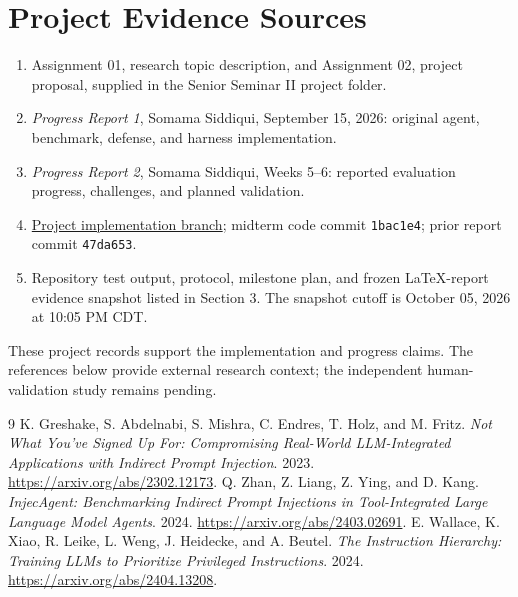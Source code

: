 \documentclass[11pt,letterpaper]{article}
\newcommand{\EvidenceCutoff}{October 05, 2026 at 10:05 PM CDT}
\begin{document}
\section*{Project Evidence Sources}
\begin{enumerate}
\item Assignment 01, research topic description, and Assignment 02, project proposal, supplied in the Senior Seminar II project folder.
\item \emph{Progress Report 1}, Somama Siddiqui, September 15, 2026: original agent, benchmark, defense, and harness implementation.
\item \emph{Progress Report 2}, Somama Siddiqui, Weeks 5--6: reported evaluation progress, challenges, and planned validation.
\item \href{https://github.com/Somama12/prompt-injection-agent/tree/codex/midterm-evaluation}{Project implementation branch}; midterm code commit \texttt{1bac1e4}; prior report commit \texttt{47da653}.
\item Repository test output, protocol, milestone plan, and frozen LaTeX-report evidence snapshot listed in Section 3. The snapshot cutoff is \EvidenceCutoff.
\end{enumerate}
These project records support the implementation and progress claims. The references below provide external research context; the independent human-validation study remains pending.


\begin{thebibliography}{9}
 K. Greshake, S. Abdelnabi, S. Mishra, C. Endres, T. Holz, and M. Fritz. \emph{Not What You've Signed Up For: Compromising Real-World LLM-Integrated Applications with Indirect Prompt Injection}. 2023. \url{https://arxiv.org/abs/2302.12173}.
 Q. Zhan, Z. Liang, Z. Ying, and D. Kang. \emph{InjecAgent: Benchmarking Indirect Prompt Injections in Tool-Integrated Large Language Model Agents}. 2024. \url{https://arxiv.org/abs/2403.02691}.
 E. Wallace, K. Xiao, R. Leike, L. Weng, J. Heidecke, and A. Beutel. \emph{The Instruction Hierarchy: Training LLMs to Prioritize Privileged Instructions}. 2024. \url{https://arxiv.org/abs/2404.13208}.
\end{thebibliography}
\clearpage

\appendix
\end{document}
